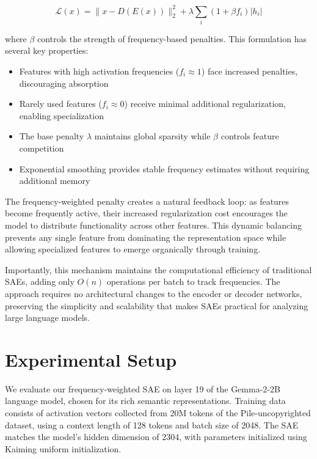 \documentclass{article} %
\begin{document}
\begin{equation}
    \mathcal{L}(x) = \|x - D(E(x))\|_2^2 + \lambda\sum_i (1 + \beta f_i)|h_i|
\end{equation}

where $\beta$ controls the strength of frequency-based penalties. This formulation has several key properties:

\begin{itemize}
    \item Features with high activation frequencies ($f_i \approx 1$) face increased penalties, discouraging absorption
    \item Rarely used features ($f_i \approx 0$) receive minimal additional regularization, enabling specialization
    \item The base penalty $\lambda$ maintains global sparsity while $\beta$ controls feature competition
    \item Exponential smoothing provides stable frequency estimates without requiring additional memory
\end{itemize}

The frequency-weighted penalty creates a natural feedback loop: as features become frequently active, their increased regularization cost encourages the model to distribute functionality across other features. This dynamic balancing prevents any single feature from dominating the representation space while allowing specialized features to emerge organically through training.

Importantly, this mechanism maintains the computational efficiency of traditional SAEs, adding only $O(n)$ operations per batch to track frequencies. The approach requires no architectural changes to the encoder or decoder networks, preserving the simplicity and scalability that makes SAEs practical for analyzing large language models.

\section{Experimental Setup}
\label{sec:experimental}

We evaluate our frequency-weighted SAE on layer 19 of the Gemma-2-2B language model, chosen for its rich semantic representations. Training data consists of activation vectors collected from 20M tokens of the Pile-uncopyrighted dataset, using a context length of 128 tokens and batch size of 2048. The SAE matches the model's hidden dimension of 2304, with parameters initialized using Kaiming uniform initialization.
\end{document}
